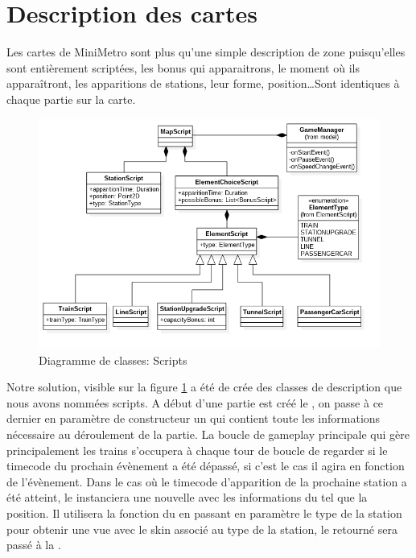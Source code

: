 \documentclass[report, backcover, french, nodocumentinfo]{upmethodology-document}
\begin{document}
		\section{Description des cartes}
				Les cartes de MiniMetro sont plus qu'une simple description de zone puisqu'elles sont entièrement scriptées, les bonus qui apparaitrons, le moment où ils apparaîtront, les apparitions de stations, leur forme, position\ldots Sont identiques à chaque partie sur la carte.
				\begin{figure}[h!]
					\centering
					\includegraphics[width=\textwidth]{figures/ScriptsClassDiagram}
					\caption{Diagramme de classes: Scripts}
					\label{fig:ScriptsClassDiagram}
				\end{figure}
				Notre solution, visible sur la figure \ref{fig:ScriptsClassDiagram} a été de crée des classes de description que nous avons nommées scripts. A début d'une partie est créé le , on passe à ce dernier en paramètre de constructeur un  qui contient toute les informations nécessaire au déroulement de la partie.
				La boucle de gameplay principale qui gère principalement les trains s'occupera à chaque tour de boucle de regarder si le timecode du prochain évènement a été dépassé, si c'est le cas il agira en fonction de l'évènement.
				Dans le cas où le timecode d'apparition de la prochaine station a été atteint, le  instanciera une nouvelle  avec les informations du  tel que la position. Il utilisera la fonction  du  en passant en paramètre le type de la station pour obtenir une vue avec le skin associé au type de la station, le  retourné sera passé à la .
\end{document}
